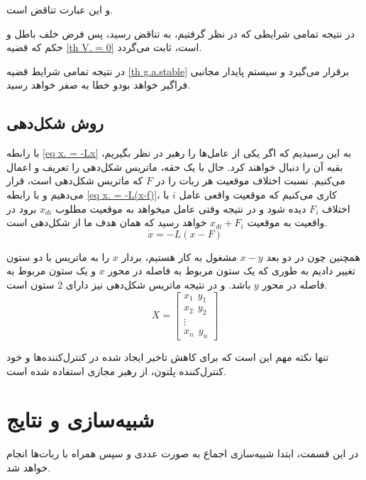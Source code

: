 و این عبارت تناقض است.

در نتیجه تمامی شرایطی که در نظر گرفتیم، به تناقض رسید، پس فرض خلف باطل و حکم که قضیه \ref{th V. = 0} است، ثابت می‌گردد.

در نتیجه تمامی شرایط قضیه \ref{th g.a.stable} برقرار می‌گیرد و سیستم پایدار مجانبی فراگیر خواهد بودو خطا به صفر خواهد رسید.

\subsection{روش شکل‌دهی}
با رابطه \ref{eq x. = -Lx} به این رسیدیم که اگر یکی از عامل‌ها را رهبر در نظر بگیریم، بقیه آن را دنبال خواهند کرد. حال با یک حقه، ماتریس شکل‌دهی را تعریف و اعمال می‌کنیم. نسبت اختلاف موقعیت هر ربات را در $F$ که ماتریس شکل‌دهی است، قرار می‌دهیم و با رابطه \ref{eq x. = -L(x-f)}، کاری می‌کنیم که موقعیت واقعی عامل $i$ با اختلاف $F_i$ دیده شود و در نتیجه وقتی عامل میخواهد به موقعیت مطلوب $x_{di}$ برود در واقعیت به موقعیت $x_{di} + F_i$ خواهد رسید که همان هدف ما از شکل‌دهی است.
\begin{equation}\label{eq x. = -L(x-f)}
	\dot{x} = -L(x-F)
\end{equation} 

همچنین چون در دو بعد $x-y$ مشغول به کار هستیم، بردار $x$ را به ماتریس با دو ستون تغییر دادیم به طوری که یک ستون مربوط به فاصله در محور $x$ و یک ستون مربوط به فاصله در محور $y$ باشد. و در نتیجه ماتریس شکل‌دهی نیز دارای 2 ستون است.
\begin{equation}\label{eq X = [x y]}
	X = 
	\begin{bmatrix}
	x_1~~ y_1 \\
	x_2~~ y_2 \\
	\vdots \\
	x_n ~~y_n
	\end{bmatrix}
\end{equation}

تنها نکته مهم این است که برای کاهش تاخیر ایجاد شده در کنترل‌کننده‌ها و خود کنترل‌کننده پلتون، از رهبر مجازی استفاده شده است.

\section{شبیه‌سازی و نتایج}
در این قسمت، ابتدا شبیه‌سازی اجماع به صورت عددی و سپس همراه با ربات‌ها انجام خواهد شد.


